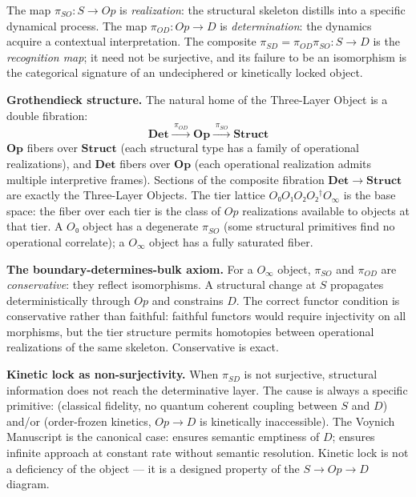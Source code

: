 \documentclass[12pt,a4paper]{article}
\begin{document}
The map $\pi_{SO}: S \to Op$ is \emph{realization}: the structural skeleton distills into a specific dynamical process. The map $\pi_{OD}: Op \to D$ is \emph{determination}: the dynamics acquire a contextual interpretation. The composite $\pi_{SD} = \pi_{OD} $\circ$ \pi_{SO}: S \to D$ is the \emph{recognition map}; it need not be surjective, and its failure to be an isomorphism is the categorical signature of an undeciphered or kinetically locked object.

\textbf{Grothendieck structure.} The natural home of the Three-Layer Object is a double fibration:
\[
  \mathbf{Det} \xrightarrow{\;\pi_{OD}\;} \mathbf{Op} \xrightarrow{\;\pi_{SO}\;} \mathbf{Struct}
\]
$\mathbf{Op}$ fibers over $\mathbf{Struct}$ (each structural type has a family of operational realizations), and $\mathbf{Det}$ fibers over $\mathbf{Op}$ (each operational realization admits multiple interpretive frames). Sections of the composite fibration $\mathbf{Det} \to \mathbf{Struct}$ are exactly the Three-Layer Objects. The tier lattice $O₀ $\subset$ O₁ $\subset$ O₂ $\subset$ O₂^\dagger $\subset$ O_{\infty}$ is the base space: the fiber over each tier is the class of $Op$ realizations available to objects at that tier. A $O₀$ object has a degenerate $\pi_{SO}$ (some structural primitives find no operational correlate); a $O_{\infty}$ object has a fully saturated fiber.

\textbf{The boundary-determines-bulk axiom.} For a $O_{\infty}$ object, $\pi_{SO}$ and $\pi_{OD}$ are \emph{conservative}: they reflect isomorphisms. A structural change at $S$ propagates deterministically through $Op$ and constrains $D$. The correct functor condition is conservative rather than faithful: faithful functors would require injectivity on all morphisms, but the tier structure permits homotopies between operational realizations of the same skeleton. Conservative is exact.

\textbf{Kinetic lock as non-surjectivity.} When $\pi_{SD}$ is not surjective, structural information does not reach the determinative layer. The cause is always a specific primitive:  (classical fidelity, no quantum coherent coupling between $S$ and $D$) and/or  (order-frozen kinetics, $Op \to D$ is kinetically inaccessible). The Voynich Manuscript is the canonical case:  ensures semantic emptiness of $D$;  ensures infinite approach at constant rate without semantic resolution. Kinetic lock is not a deficiency of the object --- it is a designed property of the $S \to Op \to D$ diagram.
\end{document}
